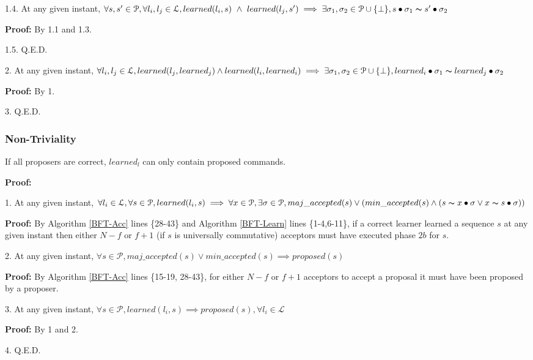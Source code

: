 \indent\indent\indent\parbox{\linewidth-\algorithmicindent*3}{\strut1.4. At any given instant, $\forall s,s' \in \mathcal{P}, \forall l_i,l_j \in \mathcal{L}, learned(l_i,s)\ \land\ learned(l_j,s') \implies \exists \sigma_1,\sigma_2 \in \mathcal{P} \cup \{\bot\}, s \bullet \sigma_1 \thicksim s' \bullet \sigma_2$ }\par
\indent\indent\indent\indent\parbox{\linewidth}{\strut\textbf{Proof:} By 1.1 and 1.3.}\par
\indent\indent\indent\parbox{\linewidth}{\strut1.5. Q.E.D. }\par
\parbox{\linewidth-\algorithmicindent*3}{\strut2. At any given instant, $\forall l_i,l_j \in \mathcal{L}, learned(l_j,learned_j) \land learned(l_i,learned_i) \implies \exists \sigma_1,\sigma_2 \in \mathcal{P} \cup \{\bot\}, learned_i \bullet \sigma_1 \thicksim learned_j \bullet \sigma_2$}\par
\indent\indent\parbox{\linewidth}{\strut\textbf{Proof:} By 1.}\par
\parbox{\linewidth}{\strut3. Q.E.D.} \par

\subsubsection{Non-Triviality}
\begin{theorem}
If all proposers are correct, $learned_l$ can only contain proposed commands. \label{N-T1} \par
\end{theorem} 
\textbf{Proof:} \par
\parbox{\linewidth}{\strut1. At any given instant, $\forall l_i \in \mathcal{L}, \forall s \in \mathcal{P}, learned(l_i,s) \implies \forall x \in \mathcal{P}, \exists \sigma \in \mathcal{P},  maj\_accepted(s) \lor (min\_accepted(s) \land  (s \thicksim x \bullet \sigma \lor x \thicksim s \bullet \sigma))$ }\par
\indent\indent\parbox{\linewidth}{\strut\textbf{Proof:} By Algorithm \ref{BFT-Acc} lines \{28-43\} and Algorithm \ref{BFT-Learn} lines \{1-4,6-11\}, if a correct learner learned a sequence $s$ at any given instant then either $N-f$ or $f+1$ (if $s$ is universally commutative) acceptors must have executed phase $2b$ for $s$.}\par
\parbox{\linewidth}{\strut2. At any given instant, $\forall s \in \mathcal{P}, maj\_accepted(s) \lor min\_accepted(s) \implies proposed(s)$ }\par
\indent\indent\parbox{\linewidth}{\strut\textbf{Proof:} By Algorithm \ref{BFT-Acc} lines \{15-19, 28-43\}, for either $N-f$ or $f+1$ acceptors to accept a proposal it must have been proposed by a proposer.}\par
\parbox{\linewidth}{\strut3. At any given instant, $\forall s \in \mathcal{P}, learned(l_i,s) \implies proposed(s),\forall l_i \in \mathcal{L}$}\par
\indent\indent\parbox{\linewidth}{\strut\textbf{Proof:} By 1 and 2.}\par
\parbox{\linewidth}{\strut4. Q.E.D.}\par

